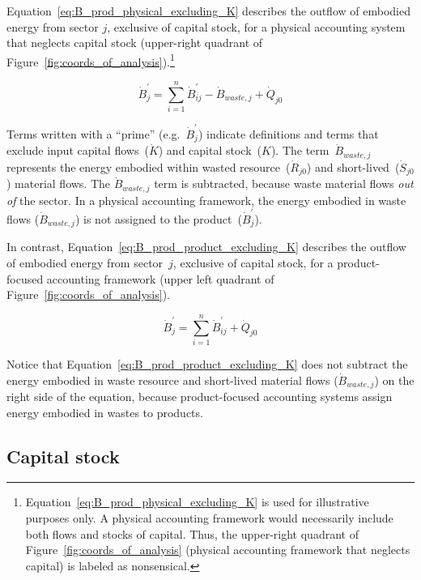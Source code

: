 Equation~\ref{eq:B_prod_physical_excluding_K} 
describes the outflow of embodied energy from sector $j$, 
exclusive of capital stock, 
for a physical accounting system 
that neglects capital stock (upper-right quadrant of Figure~\ref{fig:coords_of_analysis}).\footnote{Equation~\ref{eq:B_prod_physical_excluding_K} 
	is used for illustrative purposes only. 
	A physical accounting framework would necessarily 
	include both flows and stocks of capital.
	Thus, the upper-right quadrant of Figure~\ref{fig:coords_of_analysis}
	(physical accounting framework that neglects capital)
	is labeled as nonsensical.}

\begin{equation} \label{eq:B_prod_physical_excluding_K}
	\dot{B}_{j}^{'}
	= \sum\limits_{i=1}^{n} \dot{B}_{ij}^{'} 
	- \dot{B}_{waste,j}
	+ \dot{Q}_{j0}
\end{equation}

\noindent{}Terms written with a ``prime''
(e.g.~$\dot{B}_{j}^{'}$) indicate definitions and terms that 
exclude input capital flows~($\dot{K}$) and capital stock~($K$).
The term~$\dot{B}_{waste,j}$ represents the energy embodied 
within wasted resource~($\dot{R}_{j0}$) 
and short-lived~($\dot{S}_{j0}$) material flows.
The $\dot{B}_{waste,j}$ term is subtracted, because waste material flows \emph{out of}
the sector. 
In a physical accounting framework, the energy embodied 
in waste flows ($\dot{B}_{waste,j}$)
is not assigned to the product~($\dot{B}_{j}^{'}$).

In contrast, Equation~\ref{eq:B_prod_product_excluding_K} describes the outflow 
of embodied energy from sector~$j$,
exclusive of capital stock,
for a product-focused accounting framework 
(upper left quadrant of Figure~\ref{fig:coords_of_analysis}).

\begin{equation} \label{eq:B_prod_product_excluding_K}
	\dot{B}_{j}^{'}
	= \sum\limits_{i=1}^{n} \dot{B}_{ij}^{'} 
	+ \dot{Q}_{j0}
\end{equation}

\noindent{}Notice that Equation~\ref{eq:B_prod_product_excluding_K} 
does not subtract the energy embodied in waste resource and short-lived material
flows ($\dot{B}_{waste,j}$) on the right side of the equation, 
because product-focused accounting systems assign energy embodied in wastes
to products.


\subsection{Capital stock}
\label{sec:capital_stock}

